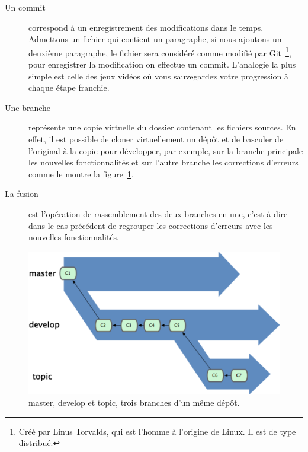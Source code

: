 \begin{description}
    \item[Un commit] correspond à un enregistrement des modifications
    dans le temps. Admettons un fichier qui contient un paragraphe, si nous
    ajoutons un deuxième paragraphe, le fichier sera considéré comme modifié
    par Git\, \footnote{Créé par Linus Torvalds, qui est l'homme à l'origine
    de Linux. Il est de type distribué.}, pour enregistrer la modification
    on effectue un commit. L'analogie la plus simple est celle des jeux
    vidéos où vous sauvegardez votre progression à chaque étape franchie.

    \item[Une branche] représente une \og copie virtuelle \fg{} du
    dossier contenant les fichiers sources. En effet, il est possible de
    cloner virtuellement un dépôt et de basculer de l'original à la copie
    pour développer, par exemple, sur la branche principale les nouvelles
    fonctionnalités et sur l'autre branche les corrections d'erreurs comme
    le montre la figure~\ref{branches}.

    \item[La fusion] est l'opération de rassemblement des deux branches en
    une, c'est-à-dire dans le cas précédent de regrouper les corrections
    d'erreurs avec les nouvelles fonctionnalités.
\end{description}

\begin{figure}[h]
    \begin{center}
        \includegraphics[scale=1]{images/branches.png}
        \caption{master, develop et topic, trois branches d'un même dépôt.}
        \label{branches}
    \end{center}
\end{figure}

